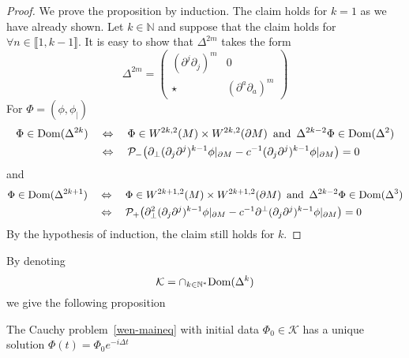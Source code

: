 \begin{proof}
We prove the proposition by induction.
The claim holds for $k =1$ as we have already shown. 
Let $k \in \mathbb{N}$ and suppose that the claim holds for $\forall n \in \llbracket 1, k-1 \rrbracket $. 
It is easy to show that $\Delta^{2m}$ takes the form
\begin{equation*}
 \Delta^{2m}  = 
\begin{pmatrix} (\partial^j\partial_j)^m & 0 \\
\star & (\partial^a \partial_a)^m\end{pmatrix}
\end{equation*}
For $\Phi = (\phi, \phi_|)$
\begin{equation*}
\begin{split}
\Phi \in \mathrm{Dom}(\Delta^{2k}) \quad &\Leftrightarrow \quad
\Phi \in W^{2k,2}(M)\times W^{2k,2}(\partial M) \enskip \mathrm{and}\enskip \Delta^{2k-2}\Phi \in \mathrm{Dom}(\Delta^{2}) \\
&\Leftrightarrow \quad 
\mathcal{P}_{-}\big(\partial_\bot(\partial_j\partial^j)^{k-1}\phi\vert_{\partial M} - c^{-1}(\partial_j\partial^j)^{k-1}\phi\vert_{\partial M} \big) = 0
\end{split}
\end{equation*}
and
\begin{equation*}
\begin{split}
\Phi \in \mathrm{Dom}(\Delta^{2k+1}) \quad &\Leftrightarrow \quad
\Phi \in W^{2k+1,2}(M)\times W^{2k+1,2}(\partial M) \enskip \mathrm{and}\enskip \Delta^{2k-2}\Phi \in \mathrm{Dom}(\Delta^{3}) \\
&\Leftrightarrow \quad 
\mathcal{P}_{+}\big(\partial_\bot^2(\partial_j\partial^j)^{k-1}\phi\vert_{\partial M} - c^{-1}\partial^\bot(\partial_j\partial^j)^{k-1}\phi\vert_{\partial M} \big) = 0
\end{split}
\end{equation*}
By the hypothesis of induction, 
the claim still holds for $k$.
\end{proof}
By denoting
\begin{equation*}
\mathcal{K} = \cap_{k\in \mathbb{N}^*} \mathrm{Dom}(\Delta^k)
\end{equation*}
we give the following proposition
\begin{proposition}\label{wen-propwellposedness}
The Cauchy problem~\cref{wen-maineq} with initial data $\Phi_0\in\mathcal{K}$ has a unique solution $\Phi(t) = \Phi_0 e^{-i\Delta t}$
\end{proposition}
